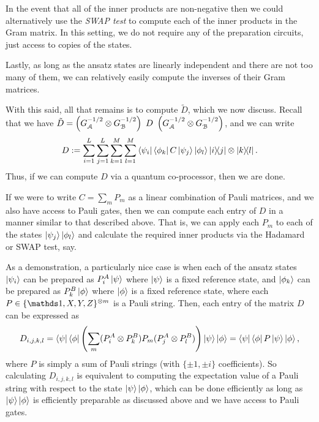 In the event that all of the inner products are non-negative then we could alternatively use the \emph{SWAP test} to compute each of the inner products in the Gram matrix. 
In this setting, we do not require any of the preparation circuits, just access to copies of the states. 

Lastly, as long as the ansatz states are linearly independent and there are not too many of them, we can relatively easily compute the inverses of their Gram matrices. 

With this said, all that remains is to compute $\tilde{D}$, which we now discuss. 
Recall that we have $\tilde{D} = \left( G_{\mathcal{A}}^{-1/2} \otimes G_{\mathcal{B}}^{-1/2} \right)\ D\ \left( G_{\mathcal{A}}^{-1/2} \otimes G_{\mathcal{B}}^{-1/2} \right)$, and we can write  
\begin{equation}
    D := \sum_{i=1}^L \sum_{j=1}^L \sum_{k=1}^M \sum_{l=1}^M \bra{\psi_i}\bra{\phi_k} C \ket{\psi_j} \ket{\phi_l} \ketbra{i}{j} \otimes \ketbra{k}{l}. 
\end{equation} 
Thus, if we can compute $D$ via a quantum co-processor, then we are done. 

If we were to write $C = \sum_{m} P_m$ as a linear combination of Pauli matrices, and we also have access to Pauli gates, then we can compute each entry of $D$ in a manner similar to that described above. 
That is, we can apply each $P_m$ to each of the states $\ket{\psi_j}\ket{\phi_l}$ and calculate the required inner products via the Hadamard or SWAP test, say.

As a demonstration, a particularly nice case is when each of the ansatz states 
$\ket{\psi_i}$ can be prepared as $P^A_i \ket{\psi}$ where $\ket{\psi}$ is a fixed reference state, and $\ket{\phi_k}$ can be prepared as $P^B_k \ket{\phi}$ where $\ket{\phi}$ is a fixed reference state, 
where each $P \in \{\id, X, Y, Z\}^{\otimes m}$ is a Pauli string.  
Then, each entry of the matrix $D$ can be expressed as 
\begin{equation} 
D_{i,j,k,l} = \bra{\psi} \bra{\phi} \left( \sum_{m} (P^A_i \otimes P^B_k) P_m (P^A_j \otimes P^B_l) \right) \ket{\psi} \ket{\phi} = \bra{\psi} \bra{\phi} P \ket{\psi} \ket{\phi}, 
\end{equation} 
where $P$ is simply a sum of Pauli strings (with $\{\pm 1, \pm i\}$ coefficients). 
So calculating $D_{i,j,k,l}$ is equivalent to computing the expectation value of a Pauli string with respect to the state $\ket{\psi}\ket{\phi}$, which can be done efficiently as long as $\ket{\psi}\ket{\phi}$ is efficiently preparable as discussed above and we have access to Pauli gates.

